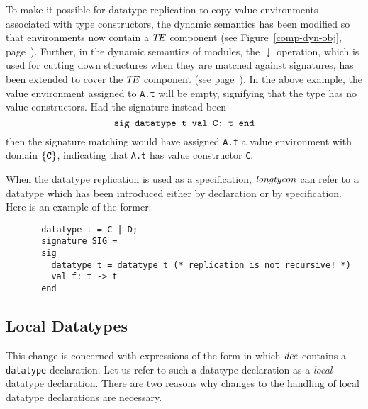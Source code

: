 To make it possible for datatype replication to copy value environments
associated with type constructors,
the dynamic semantics has been modified so that environments now contain
a $\mbox{$T\!E$}$ component (see Figure~\ref{comp-dyn-obj}, page~\pageref{comp-dyn-obj}).
Further, in the dynamic semantics of modules, the $\downarrow$ operation,
which is used for cutting down structures when they are matched against
signatures, has been extended to cover the $\mbox{$T\!E$}$ component (see page~\pageref{downarrowdef}). In the above example, the value environment assigned to 
{\tt A.t} will be empty, signifying that the type has no value constructors.
Had the signature instead been 
$$\hbox{\tt sig datatype t  val C: t end}$$
then the signature matching would have assigned {\tt A.t} a value environment
with domain $\{\hbox{\tt C}\}$, indicating that {\tt A.t} has value constructor
{\tt C}. 

When the datatype replication is used as a specification, ${\it longtycon}$
can refer to a datatype which has been introduced either by
declaration or by specification. Here is an example of the former:

\begin{verbatim}
       datatype t = C | D;
       signature SIG =
       sig 
         datatype t = datatype t (* replication is not recursive! *)
         val f: t -> t
       end
\end{verbatim}


\subsection{Local Datatypes} 
This change is concerned with
expressions of the form
in which ${\it dec}$ contains a {\tt datatype} declaration.
Let us refer to such a datatype declaration as a {\sl local} datatype
declaration.
There are two reasons why changes to the handling of local datatype
declarations
are necessary.

